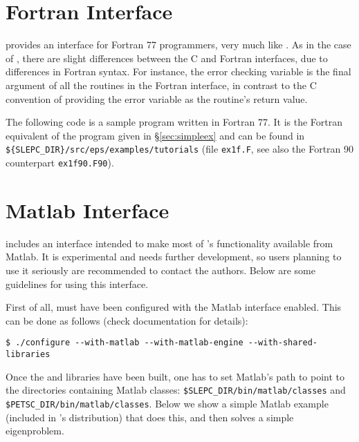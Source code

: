 \section{Fortran Interface}
\label{sec:fortran}

	\slepc provides an interface for Fortran 77 programmers, very much like \petsc. As in the case of \petsc, there are slight differences between the C and Fortran \slepc interfaces, due to differences in Fortran syntax. For instance, the error checking variable is the final argument of all the routines in the Fortran interface, in contrast to the C convention of providing the error variable as the routine's return value.

	The following code is a sample program written in Fortran 77. It is the Fortran equivalent of the program given in \S\ref{sec:simpleex} and can be found in \Verb!${SLEPC_DIR}/src/eps/examples/tutorials! (file \texttt{ex1f.F}, see also the Fortran 90 counterpart \texttt{ex1f90.F90}).

\section{Matlab Interface}
\label{sec:matlab}

 includes an interface intended to make most of \slepc's functionality available from Matlab. It is experimental and needs further development, so users planning to use it seriously are recommended to contact the authors. Below are some guidelines for using this interface.

First of all, \petsc must have been configured with the Matlab interface enabled. This can be done as follows (check \petsc documentation for details):
	\begin{Verbatim}[fontsize=\small]
	$ ./configure --with-matlab --with-matlab-engine --with-shared-libraries
	\end{Verbatim}

Once the \petsc and \slepc libraries have been built, one has to set Matlab's path to point to the directories containing Matlab classes: \Verb!$SLEPC_DIR/bin/matlab/classes! and \Verb!$PETSC_DIR/bin/matlab/classes!. Below we show a simple Matlab example (included in \slepc's distribution) that does this, and then solves a simple eigenproblem.

